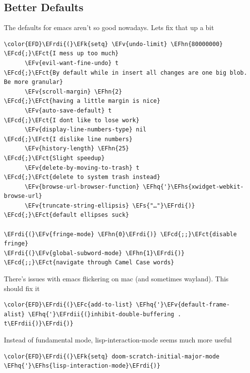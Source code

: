 \documentclass{scrartcl}
\newcommand{\EFk}[1]{\textcolor{EFk}{#1}} %
\newcommand{\EFs}[1]{\textcolor{EFs}{#1}} %
\newcommand{\EFct}[1]{\textcolor{EFct}{#1}} %
\newcommand{\EFc}[1]{\textcolor{EFc}{#1}} %
\newcommand{\EFv}[1]{\textcolor{EFv}{#1}} %
\newcommand{\EFcd}[1]{\textcolor{EFcd}{#1}} %
\newcommand{\EFhn}[1]{\textcolor{EFhn}{\textbf{#1}}} %
\newcommand{\EFhq}[1]{\textcolor{EFhq}{#1}} %
\newcommand{\EFhs}[1]{\textcolor{EFhs}{#1}} %
\newcommand{\EFrdi}[1]{\textcolor{EFrdi}{#1}} %
\newcommand{\EFrdii}[1]{\textcolor{EFrdii}{#1}} %
\begin{document}
\subsection{Better Defaults}
\label{sec:orgc928a7c}
The defaults for emacs aren't so good nowadays. Lets fix that up a bit
\begin{Code}
\begin{Verbatim}[]
\color{EFD}\EFrdi{(}\EFk{setq} \EFv{undo-limit} \EFhn{80000000}                          \EFcd{;}\EFct{I mess up too much}
      \EFv{evil-want-fine-undo} t                        \EFcd{;}\EFct{By default while in insert all changes are one big blob. Be more granular}
      \EFv{scroll-margin} \EFhn{2}                              \EFcd{;}\EFct{having a little margin is nice}
      \EFv{auto-save-default} t                          \EFcd{;}\EFct{I dont like to lose work}
      \EFv{display-line-numbers-type} nil                \EFcd{;}\EFct{I dislike line numbers}
      \EFv{history-length} \EFhn{25}                            \EFcd{;}\EFct{Slight speedup}
      \EFv{delete-by-moving-to-trash} t                  \EFcd{;}\EFct{delete to system trash instead}
      \EFv{browse-url-browser-function} \EFhq{'}\EFhs{xwidget-webkit-browse-url}
      \EFv{truncate-string-ellipsis} \EFs{"…"}\EFrdi{)}                \EFcd{;}\EFct{default ellipses suck}

\EFrdi{(}\EFv{fringe-mode} \EFhn{0}\EFrdi{)} \EFcd{;;}\EFct{disable fringe}
\EFrdi{(}\EFv{global-subword-mode} \EFhn{1}\EFrdi{)} \EFcd{;;}\EFct{navigate through Camel Case words}
\end{Verbatim}
\end{Code}

There's issues with emacs flickering on mac (and sometimes wayland). This should
fix it
\begin{Code}
\begin{Verbatim}[]
\color{EFD}\EFrdi{(}\EFc{add-to-list} \EFhq{'}\EFv{default-frame-alist} \EFhq{'}\EFrdii{(}inhibit-double-buffering . t\EFrdii{)}\EFrdi{)}
\end{Verbatim}
\end{Code}

Instead of fundamental mode, lisp-interaction-mode seems much more useful
\begin{Code}
\begin{Verbatim}[]
\color{EFD}\EFrdi{(}\EFk{setq} doom-scratch-initial-major-mode \EFhq{'}\EFhs{lisp-interaction-mode}\EFrdi{)}
\end{Verbatim}
\end{Code}
\end{document}
